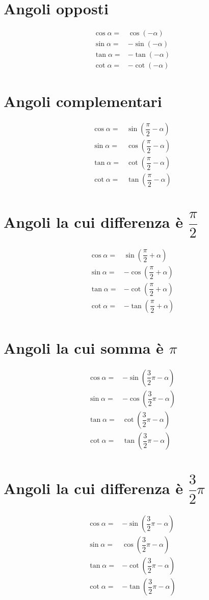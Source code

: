 \section{Angoli opposti}\label{sec:angoli-opposti}
\begin{align*}
\cos\alpha=&\cos(-\alpha)\\
\sin\alpha=&-\sin(-\alpha)\\
\tan\alpha=&-\tan(-\alpha)\\
\cot\alpha=&-\cot(-\alpha)
\end{align*}
\section{Angoli complementari}\label{sec:angoli-complementari}
\begin{align*}
\cos\alpha=&\sin(\dfrac{\pi}{2}-\alpha)\\
\sin\alpha=&\cos(\dfrac{\pi}{2}-\alpha)\\
\tan\alpha=&\cot(\dfrac{\pi}{2}-\alpha)\\
\cot\alpha=&\tan(\dfrac{\pi}{2}-\alpha)\\
\end{align*}
\section{Angoli la cui differenza è \texorpdfstring{$\dfrac{\pi}{2}$}{\textpi/2} }
\begin{align*}
\cos\alpha=&\sin(\dfrac{\pi}{2}+\alpha)\\
\sin\alpha=&-\cos(\dfrac{\pi}{2}+\alpha)\\
\tan\alpha=&-\cot(\dfrac{\pi}{2}+\alpha)\\
\cot\alpha=&-\tan(\dfrac{\pi}{2}+\alpha)\\
\end{align*}
\section{Angoli la cui somma è \texorpdfstring{$\pi$}{\textpi}}
\begin{align*}
\cos\alpha=&-\sin(\dfrac{3}{2}\pi-\alpha)\\
\sin\alpha=&-\cos(\dfrac{3}{2}\pi-\alpha)\\
\tan\alpha=&\cot(\dfrac{3}{2}\pi-\alpha)\\
\cot\alpha=&\tan(\dfrac{3}{2}\pi-\alpha)\\
\end{align*}
\section{Angoli la cui differenza è \texorpdfstring{$\dfrac{3}{2}\pi$}{3/2 \textpi}}
\begin{align*} 
\cos\alpha=&-\sin(\dfrac{3}{2}\pi-\alpha)\\
\sin\alpha=&\cos(\dfrac{3}{2}\pi-\alpha)\\
\tan\alpha=&-\cot(\dfrac{3}{2}\pi-\alpha)\\
\cot\alpha=&-\tan(\dfrac{3}{2}\pi-\alpha)\\
\end{align*}
